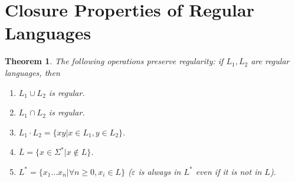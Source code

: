 \documentclass{article}
\newtheorem{theorem}{Theorem}
\begin{document}
\section{Closure Properties of Regular Languages}
\begin{theorem}
The following operations preserve regularity: if $L_1, L_2$ are regular languages, then
\begin{enumerate}
    \item $L_1 \cup L_2$ is regular.
    \item $L_1 \cap L_2$ is regular.
    \item $L_1 \cdot L_2 = \{xy | x \in L_1, y\in L_2\}$.
    \item $\overline{L} = \{x \in \Sigma^* | x \notin L\}$.
    \item $L^* = \{x_1 \ldots x_n | \forall n \geq 0, x_i \in L\}$ ($\varepsilon$ is always in $L^*$ even if it is not in $L$).
\end{enumerate}
\end{theorem}
\end{document}

